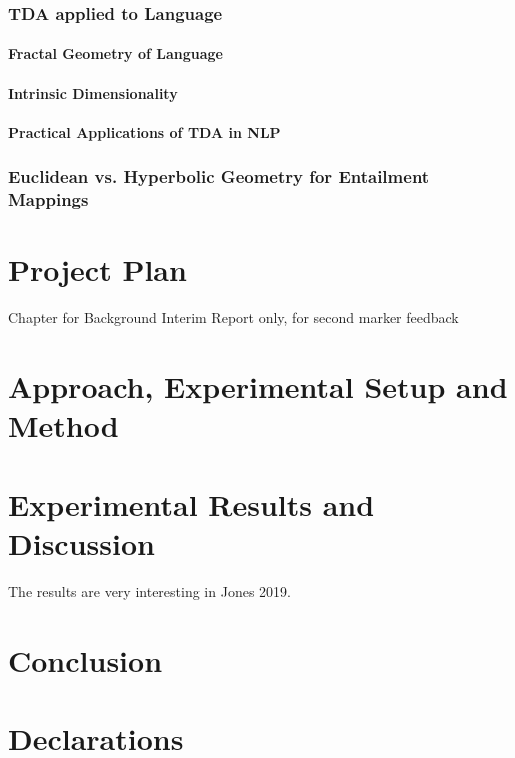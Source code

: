 \documentclass[12pt,twoside]{report}
\begin{document}
\subsection{TDA applied to Language}
\subsubsection{Fractal Geometry of Language}
\subsubsection{Intrinsic Dimensionality}
\subsubsection{Practical Applications of TDA in NLP}
\subsection{Euclidean vs. Hyperbolic Geometry for Entailment Mappings}



\chapter{Project Plan}
Chapter for Background Interim Report only, for second marker feedback




\chapter{Approach, 
Experimental Setup and Method}


\chapter{Experimental Results and Discussion}
The results are very interesting in Jones 2019.

\chapter{Conclusion}





\chapter*{Declarations}
\end{document}
